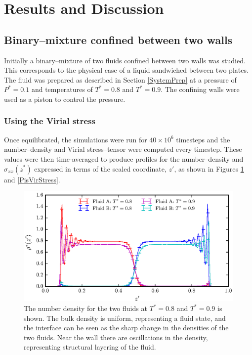 \section{Results and Discussion}
\subsection{Binary--mixture confined between two walls}
Initially a binary--mixture of two fluids confined between two walls was studied. 
This corresponds to the physical case of a liquid sandwiched between two plates.
The fluid was prepared as described in Section \ref{SystemPrep} at a pressure of $P^{*} = 0.1$ and temperatures of $T^{*} = 0.8$ and $T^{*} = 0.9$.
The confining walls were used as a piston to control the pressure.

\subsubsection{Using the Virial stress}\label{VirialStressPiston}
Once equilibrated, the simulations were run for $40 \times 10^{6}$ timesteps and the number--density and Virial stress--tensor were computed every timestep.
These values were then time-averaged to produce profiles for the number--density and $\sigma_{xx}(z^{*})$ expressed in terms of the scaled coordinate, $z'$, as shown in Figures \ref{PisVirRho} and \ref{PisVirStress}. 

\FloatBarrier
\begin{figure}[h]
\centering
\includegraphics[scale=0.8]{PisVirRho}
\caption{The number density for the two fluids at $T^{*} = 0.8$ and $T^{*} = 0.9$ is shown. 
The bulk density is uniform, representing a fluid state, and the interface can be seen as the sharp change in the densities of the two fluids.
Near the wall there are oscillations in the density, representing structural layering of the fluid.}
\label{PisVirRho}
\end{figure}

